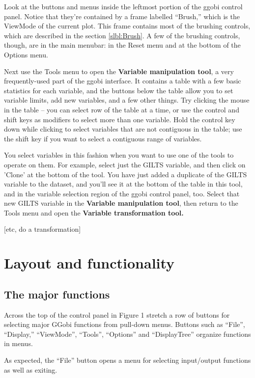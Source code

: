\documentclass[11pt]{article}
\begin{document}
Look at the buttons and menus inside the leftmost portion of the
ggobi control panel.  Notice that they're contained by a frame
labelled ``Brush,'' which is the ViewMode of the current plot.  This
frame contains most of the brushing controls, which are described in
the section \ref{slbl:Brush}.  A few of the brushing controls,
though, are in the main menubar: in the Reset menu and at the bottom
of the Options menu.

Next use the Tools menu to open the {\bf Variable manipulation tool},
a very frequently-used part of the ggobi interface.  It contains a
table with a few basic statistics for each variable, and the buttons
below the table allow you to set variable limits, add new variables,
and a few other things.  Try clicking the mouse in the table -- 
you can select row of the table at a time, or use the control and
shift keys as modifiers to select more than one variable.  Hold the
control key down while clicking to select variables that are not
contiguous in the table; use the shift key if you want to select
a contiguous range of variables. 

You select variables in this fashion when you want to use one of
the tools to operate on them.  For example, select just the GILTS
variable, and then click on 'Clone' at the bottom of the tool.
You have just added a duplicate of the GILTS variable to the dataset,
and you'll see it at the bottom of the table in this tool, and in
the variable selection region of the ggobi control panel, too.
Select that new GILTS variable in the {\bf Variable manipulation tool},
then return to the Tools menu and open the {\bf Variable transformation
tool.}

[etc, do a transformation]


\section{Layout and functionality}

\subsection{The major functions}

Across the top of the control panel in Figure 1 stretch a row of buttons for
selecting major GGobi functions from pull-down menus.  Buttons
such as ``File'', ``Display,'' ``ViewMode'', ``Tools'', ``Options'' and
``DisplayTree'' organize functions in menus.  

As expected, the ``File'' button opens a menu for selecting
input/output functions as well as exiting.
\end{document}
